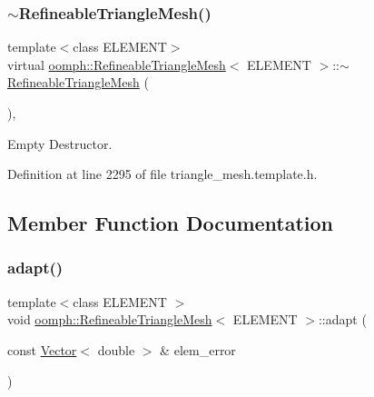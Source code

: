 \mbox{\label{classoomph_1_1RefineableTriangleMesh_a1b8b8e3142e215013533c6ee14c5484e}} 
\subsubsection{\texorpdfstring{$\sim$\+Refineable\+Triangle\+Mesh()}{~RefineableTriangleMesh()}}
{\footnotesize\ttfamily template$<$class E\+L\+E\+M\+E\+NT$>$ \\
virtual \hyperlink{classoomph_1_1RefineableTriangleMesh}{oomph\+::\+Refineable\+Triangle\+Mesh}$<$ E\+L\+E\+M\+E\+NT $>$\+::$\sim$\hyperlink{classoomph_1_1RefineableTriangleMesh}{Refineable\+Triangle\+Mesh} (\begin{DoxyParamCaption}{ }\end{DoxyParamCaption})\hspace{0.3cm}{\ttfamily [inline]}, {\ttfamily [virtual]}}



Empty Destructor. 



Definition at line 2295 of file triangle\+\_\+mesh.\+template.\+h.



\subsection{Member Function Documentation}
\mbox{\label{classoomph_1_1RefineableTriangleMesh_affc156d32aa40f84479e223f1217ebed}} 
\subsubsection{\texorpdfstring{adapt()}{adapt()}}
{\footnotesize\ttfamily template$<$class E\+L\+E\+M\+E\+NT $>$ \\
void \hyperlink{classoomph_1_1RefineableTriangleMesh}{oomph\+::\+Refineable\+Triangle\+Mesh}$<$ E\+L\+E\+M\+E\+NT $>$\+::adapt (\begin{DoxyParamCaption}\item[{const \hyperlink{classoomph_1_1Vector}{Vector}$<$ double $>$ \&}]{elem\+\_\+error }\end{DoxyParamCaption})\hspace{0.3cm}{\ttfamily [virtual]}}



